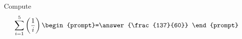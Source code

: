 \documentclass{ximera}
\author{Gregory Hartman \and Matthew Carr}
\begin{document}
\begin{exercise}

Compute
\[
\sum_{i=1}^{5}\left(\frac{1}{i}\right)\begin{prompt}=\answer{\frac{137}{60}}
\end{prompt}
\]

\end{exercise}
\end{document}
